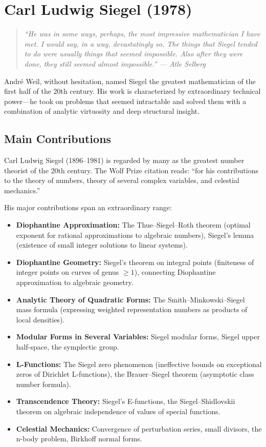 \chapter{Carl Ludwig Siegel (1978)}

\begin{quote}
\it ``He was in some ways, perhaps, the most impressive mathematician I have met. I would say, in a way, devastatingly so. The things that Siegel tended to do were usually things that seemed impossible. Also after they were done, they still seemed almost impossible.'' --- Atle Selberg
\end{quote}

Andr\'{e} Weil, without hesitation, named Siegel the greatest mathematician of the first half of the 20th century. His work is characterized by extraordinary technical power---he took on problems that seemed intractable and solved them with a combination of analytic virtuosity and deep structural insight.

\section{Main Contributions}

Carl Ludwig Siegel (1896--1981) is regarded by many as the greatest number theorist of the 20th century. The Wolf Prize citation reads: ``for his contributions to the theory of numbers, theory of several complex variables, and celestial mechanics.''

His major contributions span an extraordinary range:

\begin{itemize}
    \item \textbf{Diophantine Approximation:} The Thue--Siegel--Roth theorem (optimal exponent for rational approximations to algebraic numbers), Siegel's lemma (existence of small integer solutions to linear systems).
    \item \textbf{Diophantine Geometry:} Siegel's theorem on integral points (finiteness of integer points on curves of genus $\geq 1$), connecting Diophantine approximation to algebraic geometry.
    \item \textbf{Analytic Theory of Quadratic Forms:} The Smith--Minkowski--Siegel mass formula (expressing weighted representation numbers as products of local densities).
    \item \textbf{Modular Forms in Several Variables:} Siegel modular forms, Siegel upper half-space, the symplectic group.
    \item \textbf{L-Functions:} The Siegel zero phenomenon (ineffective bounds on exceptional zeros of Dirichlet L-functions), the Brauer--Siegel theorem (asymptotic class number formula).
    \item \textbf{Transcendence Theory:} Siegel's E-functions, the Siegel--Shidlovskii theorem on algebraic independence of values of special functions.
    \item \textbf{Celestial Mechanics:} Convergence of perturbation series, small divisors, the n-body problem, Birkhoff normal forms.
\end{itemize}

